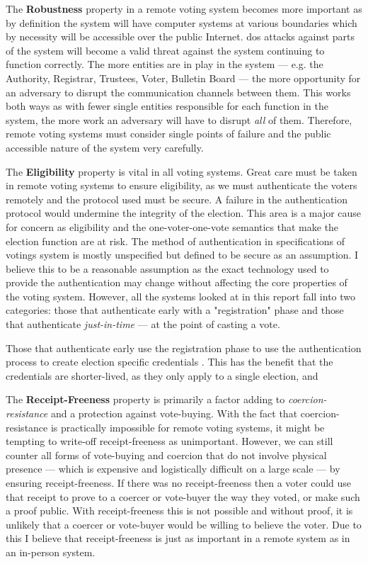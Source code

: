 The \textbf{Robustness} property in a remote voting system becomes more important as by definition the system will have computer systems at various boundaries which by necessity will be accessible over the public Internet. \Gls{dos} attacks against parts of the system will become a valid threat against the system continuing to function correctly. The more entities are in play in the system --- e.g. the Authority, Registrar, Trustees, Voter, Bulletin Board --- the more opportunity for an adversary to disrupt the communication channels between them. This works both ways as with fewer single entities responsible for each function in the system, the more work an adversary will have to disrupt \emph{all} of them. Therefore, remote voting systems must consider single points of failure and the public accessible nature of the system very carefully.

The \textbf{Eligibility} property is vital in all voting systems. Great care must be taken in remote voting systems to ensure eligibility, as we must authenticate the voters remotely and the protocol used must be secure. A failure in the authentication protocol would undermine the integrity of the election. This area is a major cause for concern as eligibility and the one-voter-one-vote semantics that make the election function are at risk. The method of authentication in specifications of votings system is mostly unspecified but defined to be secure as an assumption. I believe this to be a reasonable assumption as the exact technology used to provide the authentication may change without affecting the core properties of the voting system. However, all the systems looked at in this report fall into two categories: those that authenticate early with a "registration" phase and those that authenticate \emph{just-in-time} --- at the point of casting a vote.

Those that authenticate early use the registration phase to use the authentication process to create election specific credentials . This has the benefit that the credentials are shorter-lived, as they only apply to a single election, and

The \textbf{Receipt-Freeness} property is primarily a factor adding to \emph{coercion-resistance} and a protection against vote-buying. With the fact that coercion-resistance is practically impossible for remote voting systems, it might be tempting to write-off receipt-freeness as unimportant. However, we can still counter all forms of vote-buying and coercion that do not involve physical presence --- which is expensive and logistically difficult on a large scale --- by ensuring receipt-freeness. If there was no receipt-freeness then a voter could use that receipt to prove to a coercer or vote-buyer the way they voted, or make such a proof public. With receipt-freeness this is not possible and without proof, it is unlikely that a coercer or vote-buyer would be willing to believe the voter. Due to this I believe that receipt-freeness is just as important in a remote system as in an in-person system.

